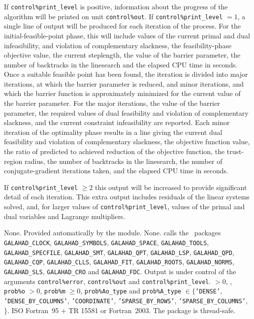 \documentclass{galahad}
\newcommand{\packagename}{BLLSB}
\begin{document}

\galinfo
If {\tt control\%print\_level} is positive, information about the progress
of the algorithm will be printed on unit {\tt control\-\%out}.
If {\tt control\%print\_level} $= 1$, a single line of output will be produced
for each iteration of the process.
For the initial-feasible-point phase,
this will include values of the current primal and dual infeasibility, and
violation of complementary slackness, the feasibility-phase objective value,
the current steplength, the value of the barrier parameter, the
number of backtracks in the linesearch and the elapsed CPU time in seconds.
Once a suitable feasible point has been found, the iteration is divided
into major iterations, at which the barrier parameter is reduced, and
minor iterations, and which the barrier function is approximately minimized
for the current value of the barrier parameter. For the major iterations,
the value of the barrier parameter, the required values of
dual feasibility and violation of complementary slackness, and the current
constraint infeasibility are reported. Each minor iteration of the
optimality phase results in a line giving
the current dual feasibility and violation of complementary slackness, the
objective function value, the ratio of predicted to achieved reduction
of the objective function, the trust-region radius, the
number of backtracks in the linesearch, the number of conjugate-gradient
iterations taken, and the elapsed CPU time in seconds.

If {\tt control\%print\_level} $\geq 2$ this
output will be increased to provide significant detail of each iteration.
This extra output includes residuals of the linear systems solved, and,
for larger values of {\tt control\%print\_level}, values of the primal and dual
variables and Lagrange multipliers.


\galgeneral

\galcommon None.
\galworkspace Provided automatically by the module.
\galroutines None.
\galmodules {\tt \packagename\_solve} calls the \galahad\ packages
{\tt GALAHAD\_CLOCK},
{\tt GALAHAD\_SY\-M\-BOLS},
{\tt GALA\-HAD\_SPACE},
{\tt GAL\-AHAD\_TOOLS},
{\tt GALAHAD\_SPECFILE},
{\tt GALAHAD\_SMT},
{\tt GALAHAD\_QPT},
{\tt GALAHAD\_LSP},
{\tt GALAHAD\_QPD},
{\tt GALAHAD\_\-CQP},
{\tt GALAHAD\_\-CLLS},
{\tt GALAHAD\_FIT},
{\tt GALAHAD\_ROOTS},
{\tt GALAHAD\_NORMS},
{\tt GALAHAD\_SLS},
{\tt GALAHAD\_CRO}
and
{\tt GAL\-AHAD\_FDC}.
\galio Output is under control of the arguments
 {\tt control\%error}, {\tt control\%out} and {\tt control\%print\_level}.
 $> 0$, , {\tt prob\%o} $> 0$,
{\tt prob\%m} $\geq  0$,
{\tt prob\%Ao\_type} and {\tt prob\%A\_type} $\in \{${\tt 'DENSE'},
 {\tt 'DENSE\_BY\_COLUMNS'},  {\tt 'COORDINATE'},
{\tt 'SPARSE\_BY\_\-ROWS'}, {\tt 'SPARSE\_BY\_\-COLUMNS'},
$\}$.
\galportability ISO Fortran~95 + TR 15581 or Fortran~2003.
The package is thread-safe.
\end{document}
